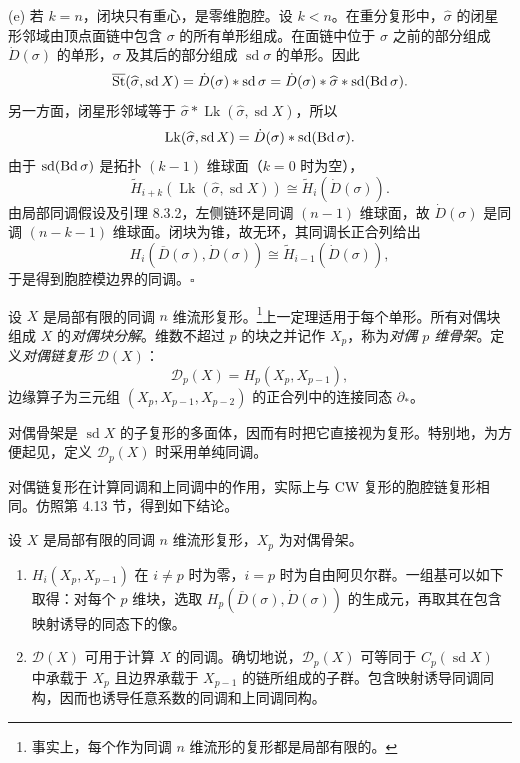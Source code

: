(e) 若 $k=n$，闭块只有重心，是零维胞腔。设 $k<n$。在重分复形中，$\widehat\sigma$ 的闭星形邻域由顶点面链中包含 $\sigma$ 的所有单形组成。在面链中位于 $\sigma$ 之前的部分组成 $\dot D(\sigma)$ 的单形，$\sigma$ 及其后的部分组成 $\operatorname{sd}\sigma$ 的单形。因此
\[
\overline{\operatorname{St}}(\widehat\sigma,\operatorname{sd}X)
=\dot D(\sigma)*\operatorname{sd}\sigma
=\dot D(\sigma)*\widehat\sigma*\operatorname{sd}(\operatorname{Bd}\sigma).
\]
另一方面，闭星形邻域等于 $\widehat\sigma*\operatorname{Lk}(\widehat\sigma,\operatorname{sd}X)$，所以
\[\operatorname{Lk}(\widehat\sigma,\operatorname{sd}X)=\dot D(\sigma)*\operatorname{sd}(\operatorname{Bd}\sigma).\]
由于 $\operatorname{sd}(\operatorname{Bd}\sigma)$ 是拓扑 $(k-1)$ 维球面（$k=0$ 时为空），
\[\widetilde H_{i+k}(\operatorname{Lk}(\widehat\sigma,\operatorname{sd}X))\cong\widetilde H_i(\dot D(\sigma)).\]
由局部同调假设及引理 8.3.2，左侧链环是同调 $(n-1)$ 维球面，故 $\dot D(\sigma)$ 是同调 $(n-k-1)$ 维球面。闭块为锥，故无环，其同调长正合列给出
\[H_i(\overline D(\sigma),\dot D(\sigma))\cong\widetilde H_{i-1}(\dot D(\sigma)),\]
于是得到胞腔模边界的同调。\hfill$\square$

设 $X$ 是局部有限的同调 $n$ 维流形复形。\footnote{事实上，每个作为同调 $n$ 维流形的复形都是局部有限的。}上一定理适用于每个单形。所有对偶块组成 $X$ 的\emph{对偶块分解}。维数不超过 $p$ 的块之并记作 $X_p$，称为\emph{对偶 $p$ 维骨架}。定义\emph{对偶链复形} $\mathcal D(X)$：
\[\mathcal D_p(X)=H_p(X_p,X_{p-1}),\]
边缘算子为三元组 $(X_p,X_{p-1},X_{p-2})$ 的正合列中的连接同态 $\partial_*$。

对偶骨架是 $\operatorname{sd}X$ 的子复形的多面体，因而有时把它直接视为复形。特别地，为方便起见，定义 $\mathcal D_p(X)$ 时采用单纯同调。

对偶链复形在计算同调和上同调中的作用，实际上与 CW 复形的胞腔链复形相同。仿照第 4.13 节，得到如下结论。

设 $X$ 是局部有限的同调 $n$ 维流形复形，$X_p$ 为对偶骨架。
\begin{enumerate}[label=(\alph*)]
\item $H_i(X_p,X_{p-1})$ 在 $i\ne p$ 时为零，$i=p$ 时为自由阿贝尔群。一组基可以如下取得：对每个 $p$ 维块，选取 $H_p(\overline D(\sigma),\dot D(\sigma))$ 的生成元，再取其在包含映射诱导的同态下的像。
\item $\mathcal D(X)$ 可用于计算 $X$ 的同调。确切地说，$\mathcal D_p(X)$ 可等同于 $C_p(\operatorname{sd}X)$ 中承载于 $X_p$ 且边界承载于 $X_{p-1}$ 的链所组成的子群。包含映射诱导同调同构，因而也诱导任意系数的同调和上同调同构。
\end{enumerate}

